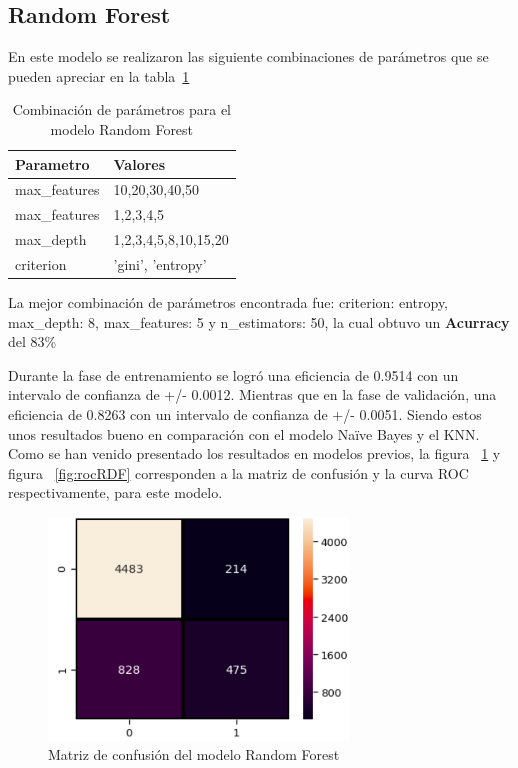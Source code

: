 \documentclass[conference]{IEEEtran}
\begin{document}
\subsection{Random Forest}
En este modelo se realizaron las siguiente combinaciones de parámetros que se pueden apreciar en la tabla~\ref{tab:parametrosRDF}
\hfill
\\ 
\begin{table}[H]
\centering
\begin{tabular}{|l|l|}
\hline
Parametro    & Valores              \\ \hline
max\_features & 10,20,30,40,50       \\ \hline
max\_features & 1,2,3,4,5            \\ \hline
max\_depth    & 1,2,3,4,5,8,10,15,20 \\ \hline
criterion    & 'gini', 'entropy'    \\ \hline
\end{tabular}
\caption{Combinación de parámetros para el modelo Random Forest}
\label{tab:parametrosRDF}
\end{table}
La mejor combinación de parámetros encontrada fue: criterion: entropy, max\_depth: 8, max\_features: 5 y n\_estimators: 50, la cual obtuvo un \textbf{Acurracy} del 83\%

Durante la fase de entrenamiento se logró una eficiencia de 0.9514 con un intervalo de confianza de +/- 0.0012. Mientras que en la fase de validación, una eficiencia de 0.8263  con un intervalo de confianza de +/- 0.0051. Siendo estos unos resultados bueno en comparación con el modelo Naïve Bayes y el KNN.
Como se han venido presentado los resultados en modelos previos, la figura ~\ref{fig:matrixRDF}  y figura ~\ref{fig:rocRDF} corresponden a la matriz de confusión y la curva ROC respectivamente, para este modelo.

\begin{center}
    \begin{figure}[H]
        \hfill
     \centerline{\includegraphics[width=8cm]{matrixRDF.png}}
    \caption{Matriz de confusión del modelo Random Forest }
    \label{fig:matrixRDF}
    \end{figure}  
\end{center}
\end{document}
